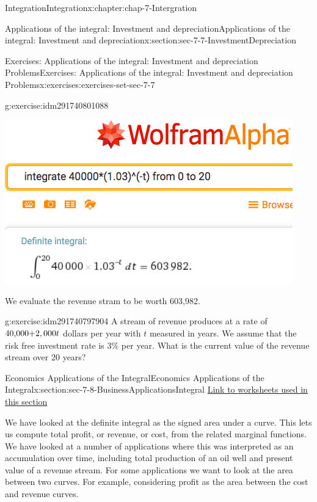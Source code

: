 \documentclass[oneside,10pt,]{book}
\numberwithin{equation}{section}
\begin{document}
\begin{chapterptx}{Integration}{}{Integration}{}{}{x:chapter:chap-7-Intergration}
\begin{sectionptx}{Applications of the integral: Investment and depreciation}{}{Applications of the integral: Investment and depreciation}{}{}{x:section:sec-7-7-InvestmentDepreciation}
\begin{exercises-subsection}{Exercises: Applications of the integral: Investment and depreciation Problems}{}{Exercises: Applications of the integral: Investment and depreciation Problems}{}{}{x:exercises:exercises-set-sec-7-7}
\begin{divisionexercise}{7}{}{}{g:exercise:idm291740801088}
\begin{sidebyside}{1}{0.1}{0.1}{0}
\begin{sbspanel}{0.8}
\includegraphics[width=\linewidth]{images/sec7-7-sol7a.png}
\end{sbspanel}%
\end{sidebyside}%
\par
We evaluate the revenue stram to be worth \textdollar{}603,982.%
\end{divisionexercise}%
\begin{divisionexercise}{8}{}{}{g:exercise:idm291740797904}%
A stream of revenue produces at a rate of \($40,000+$2,000t\) dollars per year with \(t\) measured in years.  We assume that the risk free investment rate is 3\% per year.  What is the current value of the revenue stream over 20 years?%
\end{divisionexercise}%
\end{exercises-subsection}
\end{sectionptx}
%
%
\typeout{************************************************}
\typeout{************************************************}
%
\begin{sectionptx}{Economics Applications of the Integral}{}{Economics Applications of the Integral}{}{}{x:section:sec-7-8-BusinessApplicationsIntegral}
\href{./Examples/Section-7-8-Examples.xlsx}{Link to worksheets used in this section}%
\par
We have looked at the definite integral as the signed area under a curve.  This lets us compute total profit, or revenue, or cost, from the related marginal functions.  We have looked at a number of applications where this was interpreted as an accumulation over time, including total production of an oil well and present value of a revenue stream.  For some applications we want to look at the area between two curves. For example, considering profit as the area between the cost and revenue curves.%

\end{sectionptx}
\end{chapterptx}
\end{document}

